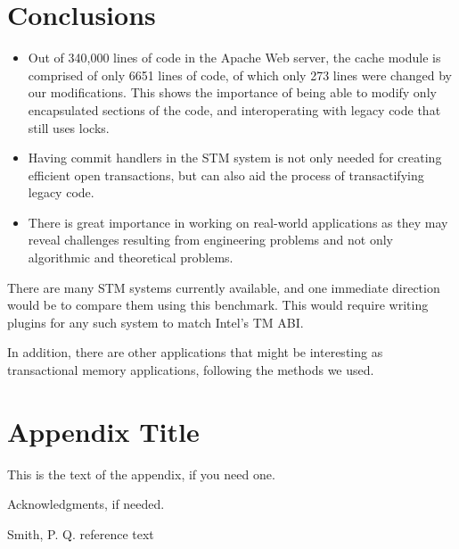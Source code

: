 \documentclass[preprint,natbib,11pt]{sigplanconf}
\begin{document}
\section{Conclusions}
\begin{itemize}
  \item Out of 340,000 lines of code in the Apache Web server, the cache module is comprised of only 6651 lines of code, of which only 273 lines were changed by our modifications. This shows the importance of being able to modify only encapsulated sections of the code, and interoperating with legacy code that still uses locks.  
  \item Having commit handlers in the STM system is not only needed for creating efficient open transactions, but can also aid the process of transactifying legacy code.
  \item There is great importance in working on real-world applications as they may reveal challenges resulting from engineering problems and not only algorithmic and theoretical problems.
\end{itemize}
There are many STM systems currently available, and one immediate direction would be to compare them using this benchmark. This would require writing plugins for any such system to match Intel's TM ABI. 

In addition, there are other applications that might be interesting as transactional memory applications, following the methods we used.

\appendix
\section{Appendix Title}

This is the text of the appendix, if you need one.

\acks

Acknowledgments, if needed.



\begin{thebibliography}{}

Smith, P. Q. reference text

\end{thebibliography}
\end{document}
